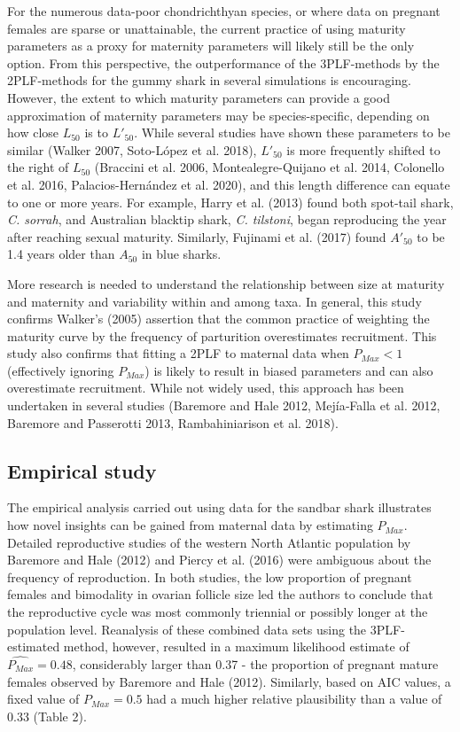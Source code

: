 \documentclass[
]{article}
\begin{document}
For the numerous data-poor chondrichthyan species, or where data on pregnant females are sparse or unattainable, the current practice of using maturity parameters as a proxy for maternity parameters will likely still be the only option. From this perspective, the outperformance of the 3PLF-methods by the 2PLF-methods for the gummy shark in several simulations is encouraging. However, the extent to which maturity parameters can provide a good approximation of maternity parameters may be species-specific, depending on how close \(L_{50}\) is to \(L'_{50}\). While several studies have shown these parameters to be similar (Walker 2007, Soto-López et al. 2018), \(L'_{50}\) is more frequently shifted to the right of \(L_{50}\) (Braccini et al. 2006, Montealegre-Quijano et al. 2014, Colonello et al. 2016, Palacios-Hernández et al. 2020), and this length difference can equate to one or more years. For example, Harry et al. (2013) found both spot-tail shark, \emph{C. sorrah}, and Australian blacktip shark, \emph{C. tilstoni}, began reproducing the year after reaching sexual maturity. Similarly, Fujinami et al. (2017) found \(A'_{50}\) to be 1.4 years older than \(A_{50}\) in blue sharks.

More research is needed to understand the relationship between size at maturity and maternity and variability within and among taxa. In general, this study confirms Walker's (2005) assertion that the common practice of weighting the maturity curve by the frequency of parturition overestimates recruitment. This study also confirms that fitting a 2PLF to maternal data when \(P_{Max} < 1\) (effectively ignoring \(P_{Max}\)) is likely to result in biased parameters and can also overestimate recruitment. While not widely used, this approach has been undertaken in several studies (Baremore and Hale 2012, Mejía‐Falla et al. 2012, Baremore and Passerotti 2013, Rambahiniarison et al. 2018).

\subsection{Empirical study}\label{empirical-study}

The empirical analysis carried out using data for the sandbar shark illustrates how novel insights can be gained from maternal data by estimating \(P_{Max}\). Detailed reproductive studies of the western North Atlantic population by Baremore and Hale (2012) and Piercy et al. (2016) were ambiguous about the frequency of reproduction. In both studies, the low proportion of pregnant females and bimodality in ovarian follicle size led the authors to conclude that the reproductive cycle was most commonly triennial or possibly longer at the population level. Reanalysis of these combined data sets using the 3PLF-estimated method, however, resulted in a maximum likelihood estimate of \(\hat{P_{Max}} = 0.48\), considerably larger than 0.37 - the proportion of pregnant mature females observed by Baremore and Hale (2012). Similarly, based on AIC values, a fixed value of \(P_{Max} = 0.5\) had a much higher relative plausibility than a value of 0.33 (Table 2).
\end{document}
